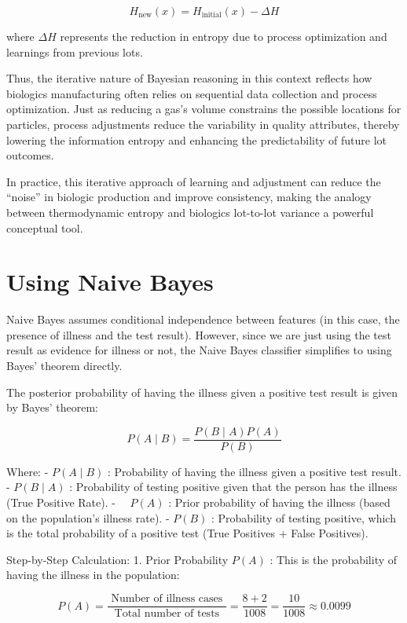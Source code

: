 \documentclass[
  12 pt,
  a4paper,
]{book}
\numberwithin{equation}{section}
\theoremstyle{plain}      %
\theoremstyle{definition} %
\theoremstyle{remark}     %
\theoremstyle{note}         %
\begin{document}
\[
H_{\text{new}}(x) = H_{\text{initial}}(x) - \Delta H
\]

where \(\Delta H\) represents the reduction in entropy due to process
optimization and learnings from previous lots.

Thus, the iterative nature of Bayesian reasoning in this context
reflects how biologics manufacturing often relies on sequential data
collection and process optimization. Just as reducing a gas's volume
constrains the possible locations for particles, process adjustments
reduce the variability in quality attributes, thereby lowering the
information entropy and enhancing the predictability of future lot
outcomes.

In practice, this iterative approach of learning and adjustment can
reduce the ``noise'' in biologic production and improve consistency,
making the analogy between thermodynamic entropy and biologics
lot-to-lot variance a powerful conceptual tool.

\newpage

\hypertarget{using-naive-bayes}{%
\section{Using Naive Bayes}\label{using-naive-bayes}}

Naive Bayes assumes conditional independence between features (in this
case, the presence of illness and the test result). However, since we
are just using the test result as evidence for illness or not, the Naive
Bayes classifier simplifies to using Bayes' theorem directly.

The posterior probability of having the illness given a positive test
result is given by Bayes' theorem:

\[
P(A \mid B)=\frac{P(B \mid A) P(A)}{P(B)}
\]

Where: - \(P(A \mid B)\) : Probability of having the illness given a
positive test result. - \(P(B \mid A)\) : Probability of testing
positive given that the person has the illness (True Positive Rate). -
\(\quad P(A)\) : Prior probability of having the illness (based on the
population's illness rate). - \(P(B)\) : Probability of testing
positive, which is the total probability of a positive test (True
Positives + False Positives).

Step-by-Step Calculation: 1. Prior Probability \(P(A)\) : This is the
probability of having the illness in the population:

\[
P(A)=\frac{\text { Number of illness cases }}{\text { Total number of tests }}=\frac{8+2}{1008}=\frac{10}{1008} \approx 0.0099
\]
\end{document}
